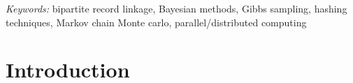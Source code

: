 \documentclass[12pt,letterpaper]{article}
\newcommand{\1}[1]{\mathbb{I}\!\left[#1\right]} %
\def\spacingset#1{\renewcommand{\baselinestretch}%
  {#1}\small\normalsize} \spacingset{1}
\begin{document}
\noindent%
{\it Keywords:} bipartite record linkage, Bayesian methods, Gibbs sampling, hashing techniques, Markov chain Monte carlo, parallel/distributed computing

\newpage
\spacingset{1.5}

\section{Introduction}
\label{sec:introduction}
	
%	
%	
%	
	
\end{document}
